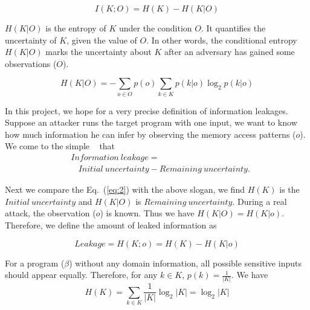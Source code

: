 
\begin{equation} \label{eq:2}
    I(K;O) = H(K) - H(K|O)
\end{equation}

$H(K|O)$ is the entropy of $K$ under the condition $O$. It quantifies the
uncertainty of $K$, given the value of $O$. In other words, the conditional 
entropy $H(K|O)$ marks the uncertainty about $K$ after an adversary has 
gained some observations ($O$).

\begin{equation}
    H(K|O) = - \sum_{o {\in} O} {p(o) \sum_{k {\in} K}{p(k|o)\log_2p(k|o)}}
\end{equation}

In this project, we hope for a very precise definition of information
leakages. Suppose an attacker runs the target program with one
input, we want to know how much information he can infer by observing the
memory access patterns ($o$). We come to the simple 
~\cite{10.1007/978-3-642-00596-1_21,AskarovC12} %
that
\begin{align*}
     & \mathit{Information\ leakage} =                                         \\
     & ~~~~ \mathit{Initial\ uncertainty} - \mathit{Remaining\ uncertainty}.
\end{align*}

Next we compare the Eq.~(\ref{eq:2}) with the above slogan, we find $H(K)$
is the $\mathit{Initial\ uncertainty}$ and $H(K|O)$ is $\mathit{Remaining\
uncertainty}$. During a real attack, the observation ($o$) is known. Thus we
have $H(K|O) = H(K|o)$. Therefore, we define the amount of leaked information as

\begin{displaymath}
    Leakage = H(K;o) = H(K) - H(K|o)
\end{displaymath}

For a program ($\beta$) without any domain information, all possible sensitive
inputs should appear equally. Therefore, for any $k \in K$, $p(k) =
\frac{1}{|K|}$. We have
$$H(K) = \sum_{k {\in} K}\frac{1}{|K|}\log_2{|K|} = \log_2{|K|}$$

